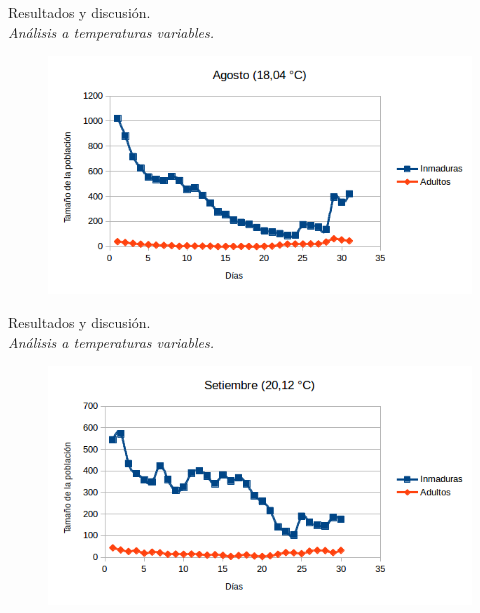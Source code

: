 \begin{frame}[t]{Resultados y discusión.\\\textit{Análisis a temperaturas variables.}}
    \begin{figure}
    \includegraphics[width=\textwidth]{./graphics/py-2010-agosto.png}
    \end{figure}
\end{frame}

\begin{frame}[t]{Resultados y discusión.\\\textit{Análisis a temperaturas variables.}}
    \begin{figure}
    \includegraphics[width=\textwidth]{./graphics/py-2010-septiembre.png}
    \end{figure}
\end{frame}

